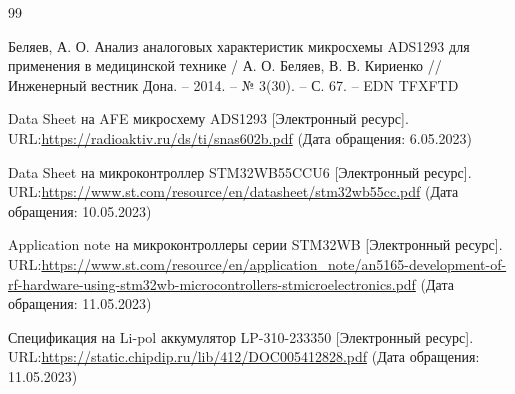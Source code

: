 \newpage
\renewcommand\refname{\centering СПИСОК ИСПОЛЬЗОВАННЫХ ИСТОЧНИКОВ}
\begin {thebibliography} {99}

Беляев, А. О. Анализ аналоговых характеристик микросхемы ADS1293 для применения в медицинской технике / А. О. Беляев, В. В. Кириенко // Инженерный вестник Дона. – 2014. – № 3(30). – С. 67. – EDN TFXFTD

Data Sheet на AFE микросхему ADS1293  [Электронный ресурс]. URL:\href{https://radioaktiv.ru/ds/ti/snas602b.pdf}{https://radioaktiv.ru/ds/ti/snas602b.pdf} (Дата обращения: 6.05.2023)



Data Sheet на микроконтроллер STM32WB55CCU6  [Электронный ресурс]. URL:\href{https://www.st.com/resource/en/datasheet/stm32wb55cc.pdf}{https://www.st.com/resource/en/datasheet/stm32wb55cc.pdf} (Дата обращения: 10.05.2023)


Application note на микроконтроллеры серии STM32WB  [Электронный ресурс]. URL:\href{https://www.st.com/resource/en/application_note/an5165-development-of-rf-hardware-using-stm32wb-microcontrollers-stmicroelectronics.pdf}{https://www.st.com/resource/en/application\_note/an5165-development-of-rf-hardware-using-stm32wb-microcontrollers-stmicroelectronics.pdf} (Дата обращения: 11.05.2023)


Спецификация на Li-pol аккумулятор LP-310-233350  [Электронный ресурс]. URL:\href{https://static.chipdip.ru/lib/412/DOC005412828.pdf}{https://static.chipdip.ru/lib/412/DOC005412828.pdf} (Дата обращения: 11.05.2023)



\end {thebibliography}




